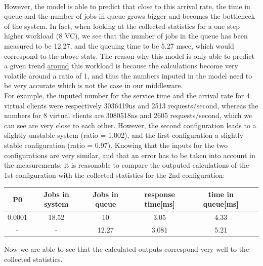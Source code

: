 \documentclass[11pt,a4paper]{article}
\begin{document}
\\However, the model is able to predict that close to this arrival rate, the time in queue and the number of jobs in queue grows bigger and becomes the bottleneck of the system. In fact, when looking at the collected statistics for a one step higher workload (8 VC), we see that the number of jobs in the queue has been measured to be 12.27, and the queuing time to be 5.27 msec, which would correspond to the above stats. The reason why this model is only able to predict a given trend \underline{around} this workload is because the calculations become very volatile around a ratio of 1, and thus the numbers inputed in the model need to be very accurate which is not the case in our middleware. 
\\
For example, the inputed number for the service time and the arrival rate for 4 virtual clients were respectively 3036419ns and 2513 requests/second, whereas the numbers for 8 virtual clients are 3080518ns and 2605 requests/second, which we can see are very close to each other. However, the second configuration leads to a slightly unstable system (ratio = 1.002), and the first configuration a slightly stable configuration (ratio = 0.97). Knowing that the inputs for the two configurations are very similar, and that an error has to be taken into account in the measurements, it is reasonable to compare the outputed calculations of the 1st configuration with the collected statistics for the 2nd configuration:
 \begin{center}

		\begin{tabular}{|c|c|c|c|c|c|}
			  \hline
			  \textbf{P0} & \textbf{Jobs in system} & \textbf{Jobs in queue} & \textbf{response time[ms]} & \textbf{time in queue[ms]}\\
			  \hline
			  0.0001  & 18.52 & 10 & 3.05 & 4.33 \\
			  - & - & 12.27  & 3.081 & 5.21 \\
			  \hline
		\end{tabular}
 \end{center}
Now we are able to see that the calculated outputs correspond very well to the collected statistics.
\\\\
\end{document}
